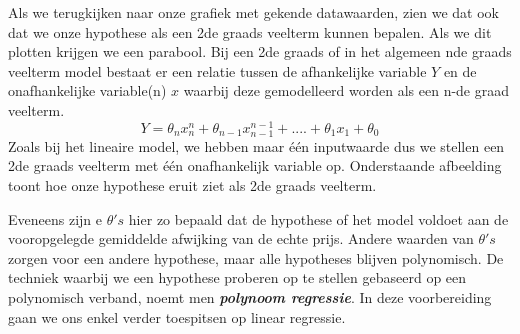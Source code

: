%
Als we terugkijken naar onze grafiek met gekende datawaarden, zien we dat ook dat we onze hypothese als een 2de graads veelterm kunnen bepalen. Als we dit plotten krijgen we een parabool. Bij een 2de graads of in het algemeen nde graads veelterm model bestaat er een relatie tussen de afhankelijke variable $Y$ en de onafhankelijke variable(n) $x$ waarbij deze gemodelleerd worden als een n-de graad veelterm.
%
\[Y = \theta_{n}x^{n}_{n} + \theta_{n-1}x^{n-1}_{n-1} + .... +  \theta_{1}x_{1} + \theta_{0} \]
%
Zoals bij het lineaire model, we hebben maar \'e\'en inputwaarde dus we stellen een 2de graads veelterm met \'e\'en onafhankelijk variable op.
Onderstaande afbeelding toont hoe onze hypothese eruit ziet als 2de graads veelterm.
\begin{center}
\end{center}
\newline
%
Eveneens zijn e $\theta's$ hier zo bepaald dat de hypothese of het model voldoet aan de vooropgelegde gemiddelde afwijking van de echte prijs. Andere waarden van $\theta's$ zorgen voor een andere  hypothese, maar alle hypotheses blijven polynomisch. De techniek waarbij we een hypothese proberen op te stellen gebaseerd op een polynomisch verband, noemt men \textbf{\textit{polynoom regressie}}. 
\newline
In deze voorbereiding gaan we ons enkel verder toespitsen op linear regressie. 

